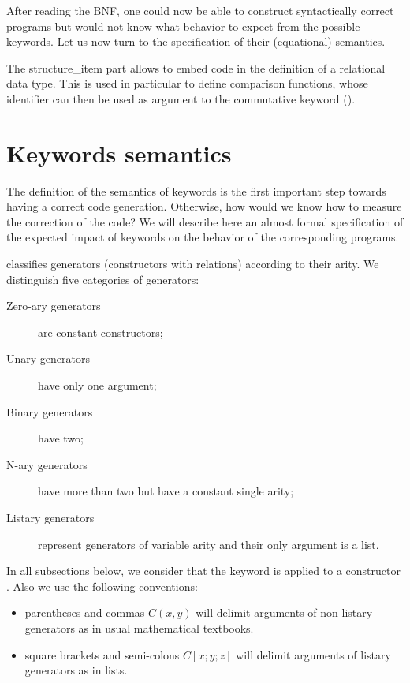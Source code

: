 After reading the BNF, one could now be able to construct
syntactically correct \moca 
programs but would not know what behavior to expect from the possible
keywords. Let us now turn to the specification of their (equational)
semantics. 

The {\sf structure\_item} part
allows to embed \ocaml code in the definition of
a relational data type. This is used in particular to define
comparison functions, whose identifier can then be used as argument to
the commutative keyword ().

\section{Keywords semantics}
\label{sec:kwd_specs}

The definition of the semantics of keywords is the first important
step towards having a correct code generation. Otherwise, how would we
know how to measure the correction of the code? We will describe here
an almost formal specification of the expected impact of \moca
keywords on the behavior of the corresponding programs.


\moca classifies generators (\ocaml constructors with relations)
according to their arity. We distinguish five categories of generators:
\begin{description}
\item[Zero-ary generators] are constant \ocaml constructors;
\item[Unary generators] have only one argument;
\item[Binary generators] have two;
\item[N-ary generators] have more than two but have a constant single arity;
\item[Listary generators] represent generators of variable arity and
  their only argument is a list. 
\end{description}


In all subsections below, we consider that the keyword is applied to a
constructor  \C. Also we use the following conventions:
\begin{itemize}
\item parentheses and commas $C(x, y)$ will delimit arguments of
  non-listary generators as in usual mathematical textbooks.
\item square brackets and semi-colons $C[x; y; z]$ will delimit arguments of
  listary generators as in \ocaml lists.
\end{itemize}

